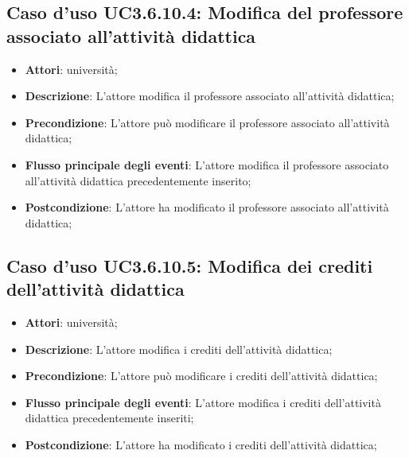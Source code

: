 \subsection{Caso d'uso \texorpdfstring{UC3.6.10.4}{UC3.6.10.4}: Modifica del professore associato all’attività didattica}
\begin{itemize}
\item \textbf{Attori}: università;
\item \textbf{Descrizione}: L'attore modifica il professore associato all’attività didattica;

\item \textbf{Precondizione}: L'attore può modificare il professore associato all’attività didattica;

\item \textbf{Flusso principale degli eventi}: L'attore modifica il professore associato all’attività didattica precedentemente inserito;

\item \textbf{Postcondizione}: L'attore ha modificato il professore associato all’attività didattica;

\end{itemize}
\subsection{Caso d'uso \texorpdfstring{UC3.6.10.5}{UC3.6.10.5}: Modifica dei crediti dell’attività didattica}
\begin{itemize}
\item \textbf{Attori}: università;
\item \textbf{Descrizione}: L'attore modifica i crediti dell’attività didattica;

\item \textbf{Precondizione}: L'attore può modificare i crediti dell’attività didattica;

\item \textbf{Flusso principale degli eventi}: L'attore modifica i crediti dell’attività didattica precedentemente inseriti;

\item \textbf{Postcondizione}: L'attore ha modificato i crediti dell’attività didattica;

\end{itemize}
